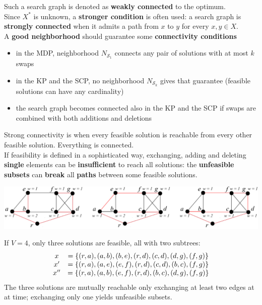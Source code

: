 \documentclass[11pt]{article}
\begin{document}
	Such a search graph is denoted as \textbf{weakly connected} to the optimum.\\
	
	Since $X^\ast$ is unknown, a \textbf{stronger condition} is often used: a search graph is \textbf{strongly connected} when it admits a path from $x$ to $y$ for every $x, y \in X$.\\
	
	A \textbf{good neighborhood} should guarantee some \textbf{connectivity conditions}
	\begin{itemize}
		\item in the MDP, neighborhood $N_{\mathcal{S}_1}$ connects any pair of solutions with at most $k$ swaps
		
		\item in the KP and the SCP, no neighborhood $N_{\mathcal{S}_k}$ gives that guarantee (feasible solutions can have any cardinality)
		
		\item the search graph becomes connected also in the KP and the SCP if swaps are combined with both additions and deletions
	\end{itemize}
	
	Strong connectivity is when every feasible solution is reachable from every other feasible solution. Everything is connected.\\
	
	If feasibility is defined in a sophisticated way, exchanging, adding and deleting \textbf{single} elements can be \textbf{insufficient} to reach all solutions: the \textbf{unfeasible subsets} can \textbf{break} all \textbf{paths} between some feasible solutions.
	
	\begin{center}
		\includegraphics[width=\columnwidth]{img/connectivity}
	\end{center}
	
	If $V = 4$, only three solutions are feasible, all with two subtrees:
	$$
	\begin{array}{c c}
		x & = \{(r , a) , (a, b) , (b, e) , (r , d) , (c, d) , (d, g ) , (f , g )\} \\
		x' & = \{(r , a) , (a, e) , (e, f ) , (r , d) , (c, d) , (b, c) , (f , g )\} \\
		x'' & = \{(r , a) , (a, b) , (e, f ) , (r , d) , (b, c) , (d, g ) , (f , g )\}
	\end{array}
	$$
	The three solutions are mutually reachable only exchanging at least two edges at at time; exchanging only one yields unfeasible subsets.
	
\end{document}

